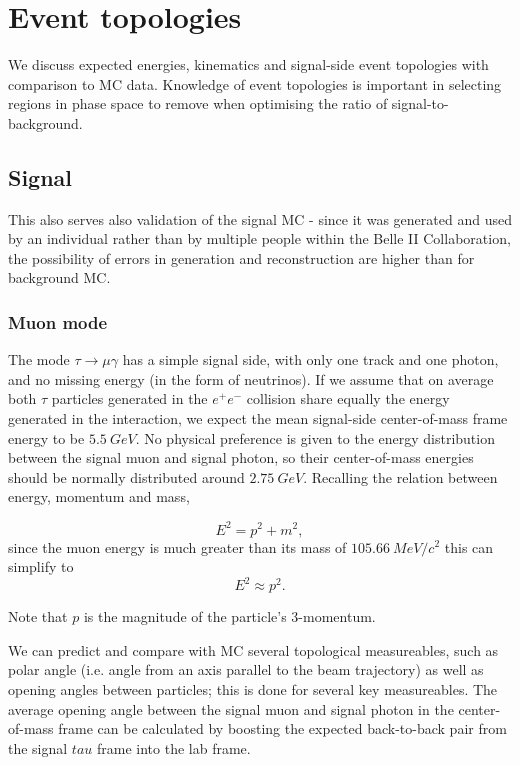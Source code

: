 \documentclass[12pt]{thesis}  %
\begin{document}
\pagebreak


\chapter{Event topologies}

We discuss expected energies, kinematics and signal-side event topologies with comparison to MC data. Knowledge of event topologies is important in selecting regions in phase space to remove when optimising the ratio of signal-to-background. 

\section{Signal}

This also serves also validation of the signal MC - since it was generated and used by an individual rather than by multiple people within the Belle II Collaboration, the possibility of errors in generation and reconstruction are higher than for background MC. 


\subsection{Muon mode}

The mode $\tau\to\mu\gamma$ has a simple signal side, with only one track and one photon, and no missing energy (in the form of neutrinos). If we assume that on average both $\tau$ particles generated in the $e^+ e^-$ collision share equally the energy generated in the interaction, we expect the mean signal-side center-of-mass frame energy to be $\SI{5.5}{GeV}$. No physical preference is given to the energy distribution between the signal muon and signal photon, so their center-of-mass energies should be normally distributed around $\SI{2.75}{GeV}$. Recalling the relation between energy, momentum and mass,

\begin{equation}
E^2 = p^2 + m^2,
\end{equation}
since the muon energy is much greater than its mass of $\SI{105.66}{MeV/c^2}$ this can simplify to
\begin{equation}
E^2 \approx p^2.
\end{equation}

Note that $p$ is the magnitude of the particle's 3-momentum.

We can predict and compare with MC several topological measureables, such as polar angle (i.e. angle from an axis parallel to the beam trajectory) as well as opening angles between particles; this is done for several key measureables. The average opening angle between the signal muon and signal photon in the center-of-mass frame can be calculated by boosting the expected back-to-back pair from the signal $tau$ frame into the lab frame.
\end{document}
